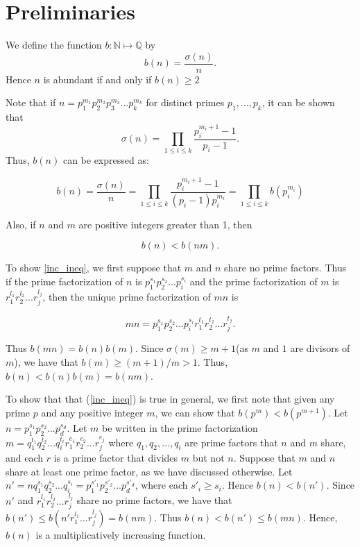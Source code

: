 \documentclass[../paper.tex]{article}
\begin{document}
\section{Preliminaries}

We define the function $b: \mathbb{N} \mapsto \mathbb{Q}$ by
%
$$b(n) = \frac{\sigma(n)}{n} .$$
%
Hence $n$ is abundant if and only if $b(n) \geq 2$

Note that if $n=p_1^{m_1}p_2^{m_2}p_3^{m_3}...p_{k}^{m_k}$ 
for distinct primes $p_1, ..., p_k$, it can be shown that 
%
$$\sigma(n) = \prod_{1 \leq i \leq k} \frac{p_i^{m_i + 1} -1}{p_i -1} .$$
%
Thus, $b(n)$ can be expressed as:


\begin{equation}\label{b_stuff}
  b(n) = \frac{\sigma(n)}{n} = \prod_{1 \leq i \leq k} 
  \frac{p_i^{m_i + 1} -1}{(p_i -1)p_{i}^{m_{i}}}
  =\prod_{1 \leq i \leq k} b(p_i^{m_i})
\end{equation}

Also, if $n$ and $m$ are positive integers greater than 1, then

\begin{equation}\label{inc_ineq}
  b(n) < b(nm). %
\end{equation}

To show \ref{inc_ineq}, we first suppose that $m$ and $n$ share no prime factors.
Thus if the prime factorization of $n$ is $p_1^{s_1} p_2^{s_2} ... p_i^{s_i}$ 
and the prime factorization of $m$ is $r_1^{l_1} r_2^{l_2} ... r_j^{l_j}$,
then the unique prime factorization of $mn$ is 

$$mn = p_1^{s_1} p_2^{s_2} ... p_i^{s_i} r_1^{t_1} r_2^{t_2} ... r_j^{t_j} .$$

Thus $b(mn) = b(n)b(m)$. Since $\sigma(m) \geq m + 1$(as $m$ and 
$1$ are divisors of $m$), we have that $b(m) \geq (m + 1) / m > 1$.
Thus,
$b(n) < b(n)b(m) = b(nm)$. 


To show that that (\ref{inc_ineq}) is true in general,
we first note that given any prime $p$ and
any positive integer $m$, we can show that $b(p^m) < b(p^{m + 1})$.
Let $n = p_1^{s_1} p_2^{s_2}... p_d^{s_d}$. 
Let $m$ be written in the prime factorization 
$m = q_1^{t_1} q_2^{t_2} ... q_i^{t_i} 
r_1^{e_1} r_2^{e_2} ... r_j^{e_j}$ where 
$q_1, q_2, ..., q_i$ are prime factors that $n$ and $m$ share,
and each $r$ is a prime factor that divides $m$ but not $n$.
Suppose that $m$ and $n$ share at least one prime factor, as 
we have discussed otherwise.
%
Let $n' = n q_1^{s_1} q_2^{s_2} ... q_i^{s_i} =
p_1^{s'_1} p_2^{s'_2} ... p_d^{s'_d}$, where each $s'_i \geq s_i$.
Hence $b(n) < b(n')$. Since $n'$ and $r_1^{l_1} r_2^{l_2} ... r_j^{l_j}$
share no prime factors, we have that 
$b(n') \leq b(n' r_1^{l_1} ... r_j^{l_j}) = b(nm)$.
Thus $b(n) < b(n') \leq b(mn)$. Hence, $b(n)$ is a 
multiplicatively increasing function.
\\
\end{document}

